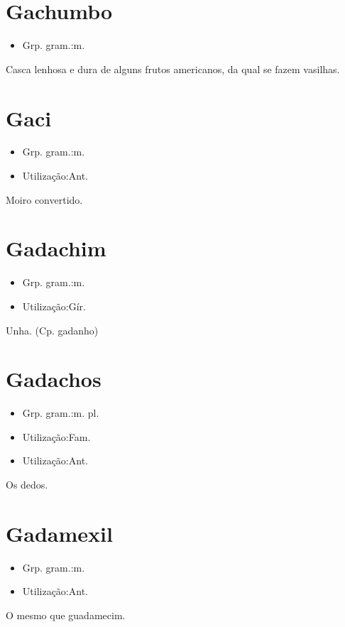 \section{Gachumbo}
\begin{itemize}
\item {Grp. gram.:m.}
\end{itemize}
Casca lenhosa e dura de alguns frutos americanos, da qual se fazem vasilhas.
\section{Gaci}
\begin{itemize}
\item {Grp. gram.:m.}
\end{itemize}
\begin{itemize}
\item {Utilização:Ant.}
\end{itemize}
Moiro convertido.
\section{Gadachim}
\begin{itemize}
\item {Grp. gram.:m.}
\end{itemize}
\begin{itemize}
\item {Utilização:Gír.}
\end{itemize}
Unha.
(Cp. \textunderscore gadanho\textunderscore )
\section{Gadachos}
\begin{itemize}
\item {Grp. gram.:m. pl.}
\end{itemize}
\begin{itemize}
\item {Utilização:Fam.}
\end{itemize}
\begin{itemize}
\item {Utilização:Ant.}
\end{itemize}
Os dedos.
\section{Gadamexil}
\begin{itemize}
\item {Grp. gram.:m.}
\end{itemize}
\begin{itemize}
\item {Utilização:Ant.}
\end{itemize}
O mesmo que \textunderscore guadamecim\textunderscore .
